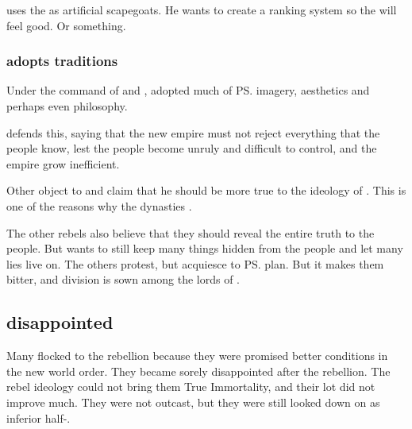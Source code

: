\Morcariel{} uses the \ashenblooded{} as artificial scapegoats. 
He wants to create a ranking system so the \resphain{} will feel good. 
Or something. 






\subsubsection{\CiriathSepher adopts \Merkyran traditions}
Under the command of \Morcariel and \Azraid, \CiriathSepher adopted much of \ps{\Merkyrah}{} imagery, aesthetics and perhaps even philosophy. 

\Azraid{} defends this, saying that the new empire must not reject everything that the people know, lest the people become unruly and difficult to control, and the empire grow inefficient.

Other \resphain{} object to  and claim that he should be more true to the ideology of . 
This is one of the reasons why the \resphan dynasties .

The other rebels also believe that they should reveal the entire truth to the people. But \Azraid{} wants to still keep many things hidden from the people and let many lies live on. The others protest, but acquiesce to \ps{\Azraid}{} plan. But it makes them bitter, and division is sown among the lords of \CiriathSepher. 









\subsection{\Bezedeth disappointed}
Many \bezedeth flocked to the rebellion because they were promised better conditions in the new world order. 
They became sorely disappointed after the rebellion. 
The rebel ideology could not bring them True Immortality, and their lot did not improve much.
They were not outcast, but they were still looked down on as inferior half-\resphain.










